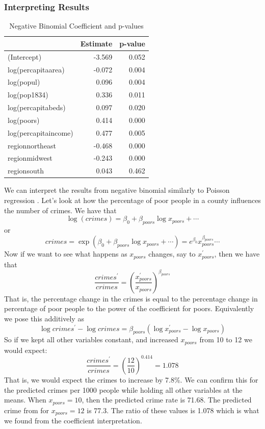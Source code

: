 \documentclass[]{article}
\begin{document}
\subsubsection{Interpreting Results}\label{interpreting-results}

\begin{longtable}[]{@{}lrr@{}}
\caption{Negative Binomial Coefficient and p-values}\tabularnewline
\toprule
& Estimate & p-value\tabularnewline
\midrule
\endhead
(Intercept) & -3.569 & 0.052\tabularnewline
log(percapitaarea) & -0.072 & 0.004\tabularnewline
log(popul) & 0.096 & 0.004\tabularnewline
log(pop1834) & 0.336 & 0.011\tabularnewline
log(percapitabeds) & 0.097 & 0.020\tabularnewline
log(poors) & 0.414 & 0.000\tabularnewline
log(percapitaincome) & 0.477 & 0.005\tabularnewline
regionnortheast & -0.468 & 0.000\tabularnewline
regionmidwest & -0.243 & 0.000\tabularnewline
regionsouth & 0.043 & 0.462\tabularnewline
\bottomrule
\end{longtable}

We can interpret the results from negative binomial similarly to Poisson
regression \cite{agresti:categorical} \cite{mit_statistics_for_applications}. Let's look at how the percentage of poor people in a county
influences the number of crimes. We have that \[
\log(crimes) = \beta_0 + \beta_{poors} \log x_{poors} + \cdots
\] or \[
crimes = \exp(\beta_0 + \beta_{poors} \log x_{poors}  + \cdots) = e^{\beta_0} x_{poors}^{\beta_{poors}} \cdots
\] Now if we want to see what happens as \(x_{poors}\) changes, say to
\(x_{poors}^{\prime}\), then we have that \[
\frac{crimes^{\prime}}{crimes} = \left(\frac{x_{poors}^{\prime}}{x_{poors}}\right)^{\beta_{poors}}
\] That is, the percentage change in the crimes is equal to the
percentage change in percentage of poor people to the power of the
coefficient for poors. Equivalently we pose this additively as \[
\log crimes^{\prime} - \log crimes = \beta_{poors} \left( \log x_{poors}^{\prime} - \log x_{poors} \right)
\] So if we kept all other variables constant, and increased
\(x_{poors}\) from 10 to 12 we would expect: \[
\frac{crimes^{\prime}}{crimes} = \left(\frac{12}{10} \right)^{0.414} = 1.078
\] That is, we would expect the crimes to increase by 7.8\%. We can
confirm this for the predicted crimes per 1000 people while holding all
other variables at the means. When \(x_{poors} = 10\), then the
predicted crime rate is 71.68. The predicted crime from for
\(x_{poors} = 12\) is 77.3. The ratio of these values is 1.078 which is
what we found from the coefficient interpretation.
\end{document}
